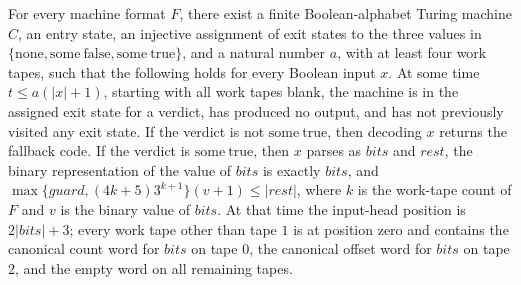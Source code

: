 \begin{lemma}
\label{Turing.MachineFormat.exists_canonCheckedFront}
\leanok
{}
For every machine format $F$, there exist a finite Boolean-alphabet Turing machine $C$,
an entry state, an injective assignment of exit states to the three values in
$\{\mathrm{none},\mathrm{some\ false},\mathrm{some\ true}\}$, and a natural number $a$,
with at least four work tapes, such that the following holds for every Boolean input
$x$. At some time $t\le a(|x|+1)$, starting with all work tapes blank, the machine is in
the assigned exit state for a verdict, has produced no output, and has not previously
visited any exit state. If the verdict is not $\mathrm{some\ true}$, then decoding $x$
returns the fallback code. If the verdict is $\mathrm{some\ true}$, then $x$ parses as
$bits$ and $rest$, the binary representation of the value of $bits$ is exactly $bits$,
and $\max\{guard,(4k+5)3^{k+1}\}(v+1)\le |rest|$, where $k$ is the work-tape count of
$F$ and $v$ is the binary value of $bits$. At that time the input-head position is
$2|bits|+3$; every work tape other than tape $1$ is at position zero and contains the
canonical count word for $bits$ on tape $0$, the canonical offset word for $bits$ on
tape $2$, and the empty word on all remaining tapes.
\end{lemma}

